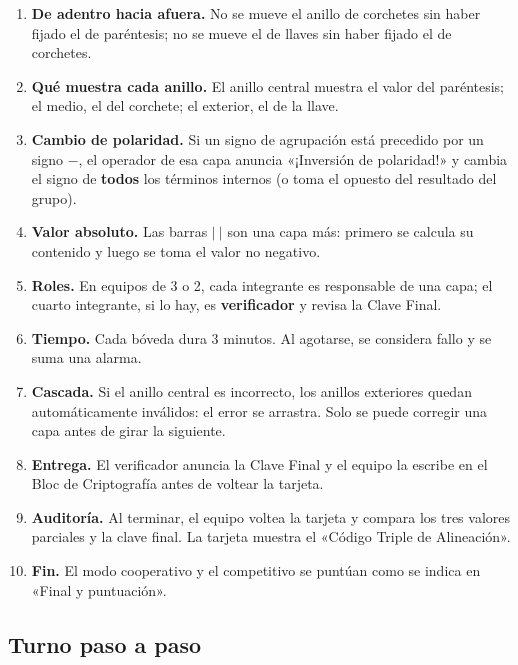 \documentclass[12pt, letterpaper]{article}
\newcommand{\abs}[1]{\lvert #1\rvert}
\begin{document}
\begin{enumerate}[leftmargin=*]
  \item \textbf{De adentro hacia afuera.} No se mueve el anillo de corchetes sin haber fijado el de paréntesis; no se mueve el de llaves sin haber fijado el de corchetes.
  \item \textbf{Qué muestra cada anillo.} El anillo central muestra el valor del paréntesis; el medio, el del corchete; el exterior, el de la llave.
  \item \textbf{Cambio de polaridad.} Si un signo de agrupación está precedido por un signo $-$, el operador de esa capa anuncia «¡Inversión de polaridad!» y cambia el signo de \textbf{todos} los términos internos (o toma el opuesto del resultado del grupo).
  \item \textbf{Valor absoluto.} Las barras $\abs{~}$ son una capa más: primero se calcula su contenido y luego se toma el valor no negativo.
  \item \textbf{Roles.} En equipos de 3 o 2, cada integrante es responsable de una capa; el cuarto integrante, si lo hay, es \textbf{verificador} y revisa la Clave Final.
  \item \textbf{Tiempo.} Cada bóveda dura $3$ minutos. Al agotarse, se considera fallo y se suma una alarma.
  \item \textbf{Cascada.} Si el anillo central es incorrecto, los anillos exteriores quedan automáticamente inválidos: el error se arrastra. Solo se puede corregir una capa antes de girar la siguiente.
  \item \textbf{Entrega.} El verificador anuncia la Clave Final y el equipo la escribe en el Bloc de Criptografía antes de voltear la tarjeta.
  \item \textbf{Auditoría.} Al terminar, el equipo voltea la tarjeta y compara los tres valores parciales y la clave final. La tarjeta muestra el «Código Triple de Alineación».
  \item \textbf{Fin.} El modo cooperativo y el competitivo se puntúan como se indica en «Final y puntuación».
\end{enumerate}

\subsection{Turno paso a paso}
\end{document}
